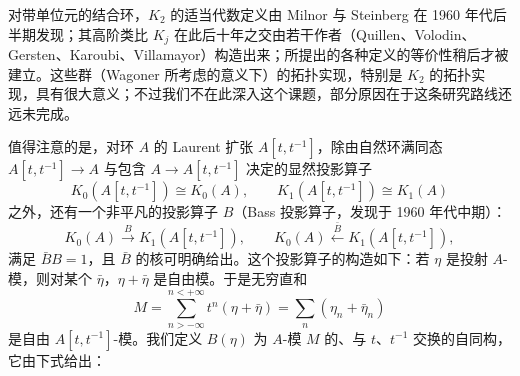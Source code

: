 对带单位元的结合环，$K_{2}$ 的适当代数定义由 Milnor 与 Steinberg 在 1960 年代后半期发现；其高阶类比 $K_{j}$ 在此后十年之交由若干作者（Quillen、Volodin、Gersten、Karoubi、Villamayor）构造出来；所提出的各种定义的等价性稍后才被建立。这些群（Wagoner 所考虑的意义下）的拓扑实现，特别是 $K_{2}$ 的拓扑实现，具有很大意义；不过我们不在此深入这个课题，部分原因在于这条研究路线还远未完成。

值得注意的是，对环 $A$ 的 Laurent 扩张 $A[t,t^{-1}]$，除由自然环满同态 $A[t,t^{-1}]\to A$ 与包含 $A\to A[t,t^{-1}]$ 决定的显然投影算子
\[
K_{0}(A[t,t^{-1}])\cong K_{0}(A),\qquad
K_{1}(A[t,t^{-1}])\cong K_{1}(A)
\]
之外，还有一个非平凡的投影算子 $B$（Bass 投影算子，发现于 1960 年代中期）：
\[
K_{0}(A)\xrightarrow{\ B\ }K_{1}(A[t,t^{-1}]),\qquad
K_{0}(A)\xleftarrow{\ \bar B\ }K_{1}(A[t,t^{-1}]),
\]
满足 $\bar BB=1$，且 $\bar B$ 的核可明确给出。这个投影算子的构造如下：若 $\eta$ 是投射 $A$-模，则对某个 $\bar\eta$，$\eta+\bar\eta$ 是自由模。于是无穷直和
\[
M=\sum_{n>-\infty}^{n<+\infty}t^{n}(\eta+\bar\eta)=\sum_{n}(\eta_{n}+\bar\eta_{n})
\]
是自由 $A[t,t^{-1}]$-模。我们定义 $B(\eta)$ 为 $A$-模 $M$ 的、与 $t$、$t^{-1}$ 交换的自同构，它由下式给出：

